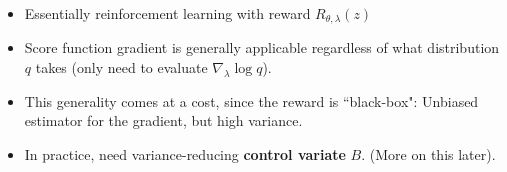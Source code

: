 \begin{frame}
\begin{itemize}
    \item Essentially reinforcement learning with reward $R_{\theta, \lambda}(z)$
    \item Score function gradient is generally applicable regardless of what distribution $q$ takes (only need to evaluate $\nabla_\lambda \log q$).
    \item This generality comes at a cost, since the reward is ``black-box": Unbiased estimator for the gradient, but high variance.
    \item In practice, need variance-reducing \textbf{control variate} $B$. (More on this later).
\end{itemize}    
\end{frame}

